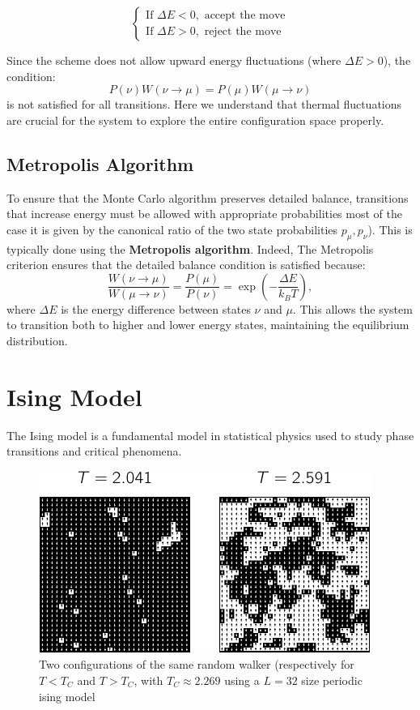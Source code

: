 \documentclass[ansiapaper]{report}
\begin{document}
\begin{multicols}{3}
$$
\begin{cases}
    \text{If } \Delta E < 0, \text{ accept the move} \\
    \text{If } \Delta E > 0, \text{ reject the move} 
\end{cases}
$$

Since the scheme does not allow upward energy fluctuations (where \( \Delta E > 0 \)), the condition:
\[
P(\nu) W(\nu \to \mu) = P(\mu) W(\mu \to \nu)
\]
is not satisfied for all transitions. Here we understand that thermal fluctuations are crucial for the system to explore the entire configuration space properly. 
\subsection{Metropolis Algorithm}

To ensure that the Monte Carlo algorithm preserves detailed balance, transitions that increase energy must be allowed with appropriate probabilities most of the case it is given by the canonical ratio of the two state probabilities $p_{\mu}, p_{\nu}$). This is typically done using the \textbf{Metropolis algorithm}.
Indeed, The Metropolis criterion ensures that the detailed balance condition is satisfied because:
\[
\frac{W(\nu \to \mu)}{W(\mu \to \nu)} = \frac{P(\mu)}{P(\nu)} = \exp\left(-\frac{\Delta E}{k_B T}\right),
\]
where \( \Delta E \) is the energy difference between states \( \nu \) and \( \mu \). This allows the system to transition both to higher and lower energy states, maintaining the equilibrium distribution.

\section{Ising Model}
The Ising model is a fundamental model in statistical physics used to study phase transitions and critical phenomena.
\begin{figure}[H]
    \begin{center}
        \includegraphics[width=1\linewidth]{figures/ising.pdf}
    \end{center}
    \caption{Two configurations of the same random walker (respectively for $T < T_C$ and $T>T_C$, with $T_C \approx 2.269$  using a $L = 32$ size periodic ising model}\label{fig:ising}
\end{figure}


\end{multicols}
\end{document}

